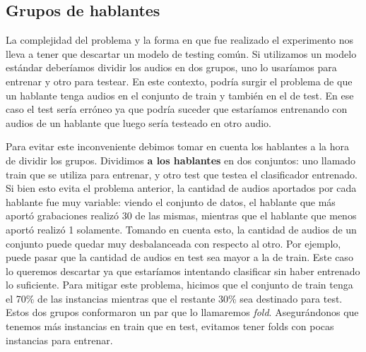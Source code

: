 
\subsection{Grupos de hablantes}
\label{grupo_de_hablantes}


La complejidad del problema y la forma en que fue realizado el experimento nos lleva a tener que descartar un modelo de testing común. Si utilizamos un modelo estándar deberíamos dividir los audios en dos grupos, uno lo usaríamos para entrenar y otro para testear. En este contexto, podría surgir el problema de que un hablante tenga audios en el conjunto de train y también en el de test. En ese caso el test sería erróneo ya que podría suceder que estaríamos entrenando con audios de un hablante que luego sería testeado en otro audio.

Para evitar este inconveniente debimos tomar en cuenta los hablantes a la hora de dividir los grupos. Dividimos \textbf{a los hablantes} en dos conjuntos: uno llamado train que se utiliza para entrenar, y otro test que testea el clasificador entrenado. Si bien esto evita el problema anterior, la cantidad de audios aportados por cada hablante fue muy variable: viendo el conjunto de datos, el hablante que más aportó grabaciones realizó 30 de las mismas, mientras que el hablante que menos aportó realizó 1 solamente. Tomando en cuenta esto, la cantidad de audios de un conjunto puede quedar muy desbalanceada con respecto al otro. Por ejemplo, puede pasar que la cantidad de audios en test sea mayor a la de train. Este caso lo queremos descartar ya que estaríamos intentando clasificar sin haber entrenado lo suficiente. Para mitigar este problema, hicimos que el conjunto de train tenga el 70\% de las instancias mientras que el restante 30\% sea destinado para test. Estos dos grupos conformaron un par que lo llamaremos \textit{fold}. Asegurándonos que tenemos más instancias en train que en test, evitamos tener folds con pocas instancias para entrenar.

